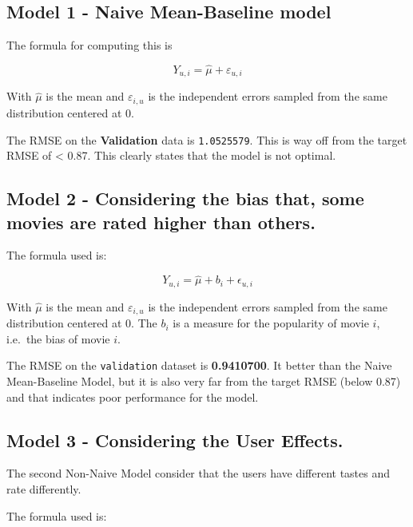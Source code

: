 \documentclass[
]{article}
\begin{document}
\hypertarget{model-1---naive-mean-baseline-model}{%
\subsection{Model 1 - Naive Mean-Baseline
model}\label{model-1---naive-mean-baseline-model}}

The formula for computing this is

\[Y_{u,i} = \hat{\mu} + \varepsilon_{u,i}\]

With \(\hat{\mu}\) is the mean and \(\varepsilon_{i,u}\) is the
independent errors sampled from the same distribution centered at 0.

The RMSE on the \textbf{Validation} data is \texttt{1.0525579}. This is
way off from the target RMSE of \textless{} 0.87. This clearly states
that the model is not optimal.

\hypertarget{model-2---considering-the-bias-that-some-movies-are-rated-higher-than-others.}{%
\subsection{Model 2 - Considering the bias that, some movies are rated
higher than
others.}\label{model-2---considering-the-bias-that-some-movies-are-rated-higher-than-others.}}

The formula used is:

\[Y_{u,i} = \hat{\mu} + b_i + \epsilon_{u,i}\]

With \(\hat{\mu}\) is the mean and \(\varepsilon_{i,u}\) is the
independent errors sampled from the same distribution centered at 0. The
\(b_i\) is a measure for the popularity of movie \(i\), i.e.~the bias of
movie \(i\).

The RMSE on the \texttt{validation} dataset is \textbf{0.9410700}. It
better than the Naive Mean-Baseline Model, but it is also very far from
the target RMSE (below 0.87) and that indicates poor performance for the
model.

\hypertarget{model-3---considering-the-user-effects.}{%
\subsection{Model 3 - Considering the User
Effects.}\label{model-3---considering-the-user-effects.}}

The second Non-Naive Model consider that the users have different tastes
and rate differently.

The formula used is:
\end{document}
